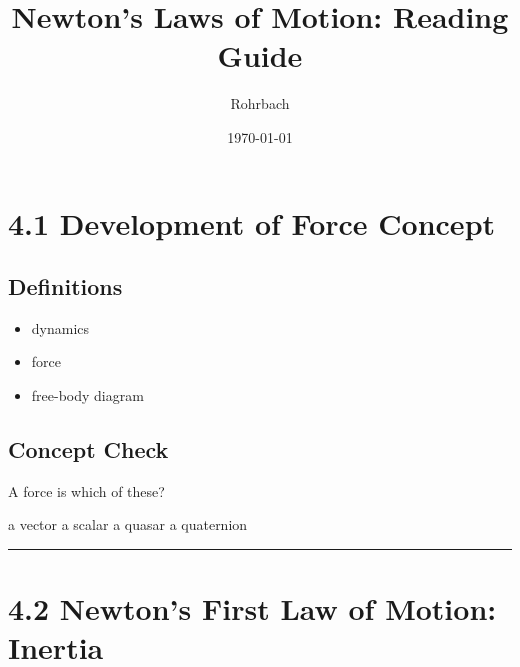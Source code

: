 \documentclass[10pt]{exam}
\title{Newton's Laws of Motion: Reading Guide}
\author{Rohrbach}
\date{\today}
\begin{document}
\maketitle





\section*{4.1 Development of Force Concept}

\subsection*{Definitions}

\begin{itemize}
  \item dynamics
  \item force
  \item free-body diagram
\end{itemize}

\subsection*{Concept Check}

A force is which of these?

\begin{oneparcheckboxes}
  \correctchoice a vector
  \choice a scalar
  \choice a quasar
  \choice a quaternion
\end{oneparcheckboxes}

\vspace{3em}
\hrule

\section*{4.2 Newton's First Law of Motion: Inertia}
\end{document}
